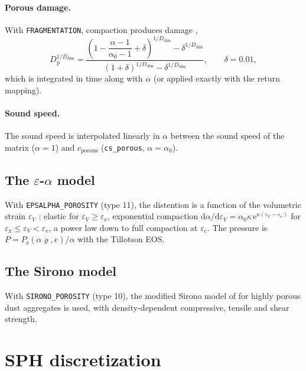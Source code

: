 \documentclass[10pt,fleqn,twoside]{article}
\newcommand{\code}[1]{\texttt{#1}}
\newcommand{\sw}[1]{\texttt{#1}}
\newcommand{\dd}{\mathrm{d}}
\begin{document}
\paragraph{Porous damage.} With \sw{FRAGMENTATION}, compaction produces damage
\citep[eq.~57]{2008Icar..198..242J},
\begin{equation}
 D_\mathrm{p}^{1/D_\mathrm{dim}} = \frac{\left(1 - \dfrac{\alpha-1}{\alpha_0-1} + \delta\right)^{1/D_\mathrm{dim}}
   - \delta^{1/D_\mathrm{dim}}}{(1+\delta)^{1/D_\mathrm{dim}} - \delta^{1/D_\mathrm{dim}}}, \qquad \delta = 0.01,
\end{equation}
which is integrated in time along with $\alpha$ (or applied exactly with the return mapping).

\paragraph{Sound speed.} The sound speed is interpolated linearly in $\alpha$ between the sound speed of the matrix
($\alpha = 1$) and $c_\mathrm{porous}$ (\code{cs\_porous}, $\alpha = \alpha_0$).

\subsection{The $\varepsilon$-$\alpha$ model}
With \sw{EPSALPHA\_POROSITY} (type 11), the distention is a function of the volumetric strain $\varepsilon_V$
\citep{2006Icar..180..514W}: elastic for $\varepsilon_V \geq \varepsilon_\mathrm{e}$, exponential compaction
$\dd\alpha/\dd\varepsilon_V = \alpha_0\kappa\,\mathrm{e}^{\kappa(\varepsilon_V-\varepsilon_\mathrm{e})}$ for
$\varepsilon_\mathrm{x} \leq \varepsilon_V < \varepsilon_\mathrm{e}$, a power law down to full compaction at
$\varepsilon_\mathrm{c}$. The pressure is $P = P_\mathrm{s}(\alpha\varrho, e)/\alpha$ with the Tillotson EOS.

\subsection{The Sirono model}
With \sw{SIRONO\_POROSITY} (type 10), the modified Sirono model of \citet{gerspe11} for highly porous dust aggregates
is used, with density-dependent compressive, tensile and shear strength.


\section{SPH discretization}
\end{document}
